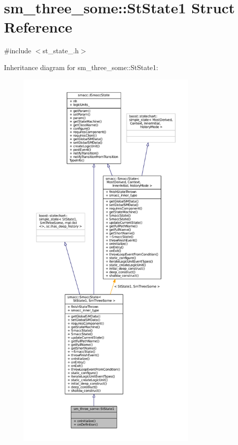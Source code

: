 \hypertarget{structsm__three__some_1_1StState1}{}\section{sm\+\_\+three\+\_\+some\+:\+:St\+State1 Struct Reference}
\label{structsm__three__some_1_1StState1}


{\ttfamily \#include $<$st\+\_\+state\+\_.\+h$>$}



Inheritance diagram for sm\+\_\+three\+\_\+some\+:\+:St\+State1\+:
\nopagebreak
\begin{figure}[H]
\begin{center}
\leavevmode
\includegraphics[height=550pt]{structsm__three__some_1_1StState1__inherit__graph}
\end{center}
\end{figure}


